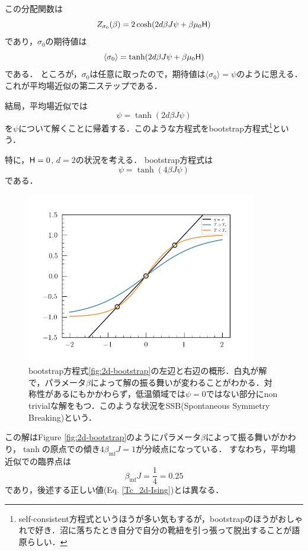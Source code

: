 	この分配関数は
	\begin{equation}
			Z_{\sigma_0}(\beta) = 2\cosh(2d\beta J\psi + \beta\mu_0\mathsf{H})
	\end{equation}
	であり，$\sigma_0$の期待値は
	\begin{equation}
			\langle\sigma_0\rangle = \tanh(2d\beta J \psi + \beta \mu_0\mathsf{H})
	\end{equation}
	である．
	ところが，$\sigma_0$は任意に取ったので，期待値は$\langle \sigma_0 \rangle = \psi$のように思える．これが平均場近似の第二ステップである．

	結局，平均場近似では
	\begin{equation}
			\psi = \tanh(2d\beta J \psi)
	\end{equation}
	を$\psi$について解くことに帰着する．このような方程式をbootstrap方程式\footnote{self-consistent方程式というほうが多い気もするが，bootstrapのほうがおしゃれで好き．沼に落ちたとき自分で自分の靴紐を引っ張って脱出することが語原らしい．}という．

	特に，$\mathsf{H} = 0$, $d = 2$の状況を考える．
	bootstrap方程式は
	\begin{equation}
			\psi = \tanh(4\beta J \psi)\label{fig:2d-bootstrap}
	\end{equation}
	である．
	\begin{figure}
			\centering
			\includegraphics[width=10cm]{./doc/src/img/mean_field.png}
			\caption{bootstrap方程式\eqref{fig:2d-bootstrap}の左辺と右辺の概形．白丸が解で，パラメータ$\beta$によって解の振る舞いが変わることがわかる．対称性があるにもかかわらず，低温領域では$\psi=0$ではない部分にnon trivialな解をもつ．このような状況をSSB(Spontaneous Symmetry Breaking)という．}
	\end{figure}
	この解はFigure \ref{fig:2d-bootstrap}のようにパラメータ$\beta$によって振る舞いがかわり，$\tanh$の原点での傾き$ 4\beta_{\text{mf}} J = 1$が分岐点になっている．
	すなわち，平均場近似での臨界点は
	\begin{equation}
			\beta_{\text{mf}} J= \frac{1}{4} = 0.25
	\end{equation}
	であり，後述する正しい値(Eq. \eqref{Tc_2d-Ising})とは異なる．

